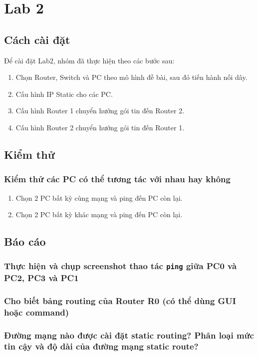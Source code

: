 \documentclass[]{article}
\begin{document}
\section{Lab 2}
\subsection{Cách cài đặt}
Để cài đặt Lab2, nhóm đã thực hiện theo các bước sau:
\begin{enumerate}
\item Chọn Router, Switch và PC theo mô hình đề bài, sau đó tiến hành nối dây.
\item Cấu hình IP Static cho các PC.
\item Cấu hình Router 1 chuyển hướng gói tin đến Router 2.
\item Cấu hình Router 2 chuyển hướng gói tin đến Router 1.
\end{enumerate}
\subsection{Kiểm thử}
\subsubsection{Kiểm thử các PC có thể tương tác với nhau hay không}
\begin{enumerate}
    \item Chọn 2 PC bất kỳ cùng mạng và ping đến PC còn lại.
    \item Chọn 2 PC bất kỳ khác mạng và ping đến PC còn lại.
\end{enumerate}

\subsection{Báo cáo}
\subsubsection{Thực hiện và chụp screenshot thao tác \texttt{ping} giữa PC0 và PC2, PC3 và PC1}
\subsubsection{Cho biết bảng routing của Router R0 (có thể dùng GUI hoặc command)}
\subsubsection{Đường mạng nào được cài đặt static routing? Phân loại mức tin cậy và độ dài của đường mạng static route?}
\end{document}
